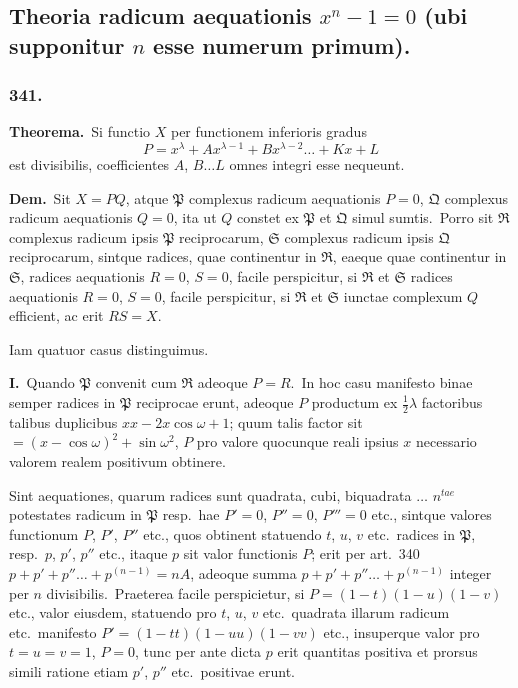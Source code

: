 \documentclass[12pt,a4paper]{article}
\theoremstyle{plain}
\theoremstyle{definition}
\theoremstyle{remark}
\begin{document}
\subsection*{Theoria radicum aequationis $x^n-1=0$ (ubi supponitur $n$
esse numerum primum).}

\subsubsection*{341.}

\textbf{Theorema.}\ Si functio $X$ per functionem inferioris gradus
\[P = x^\lambda + Ax^{\lambda-1} + Bx^{\lambda-2}\dots + Kx + L\]
est divisibilis, coefficientes $A$, $B\dots L$ omnes integri esse nequeunt.

\textbf{Dem.}\ Sit $X=PQ$, atque $\mathfrak{P}$ complexus radicum aequationis
$P=0$, $\mathfrak{Q}$ complexus radicum aequationis $Q=0$, ita ut $Q$ constet
ex $\mathfrak{P}$ et $\mathfrak{Q}$ simul sumtis.\ Porro sit $\mathfrak{R}$ complexus radicum
ipsis $\mathfrak{P}$ reciprocarum, $\mathfrak{S}$ complexus radicum ipsis $\mathfrak{Q}$
reciprocarum, sintque radices, quae continentur in $\mathfrak{R}$, eaeque quae
continentur in $\mathfrak{S}$, radices aequationis $R=0$, $S=0$, facile
perspicitur, si $\mathfrak{R}$ et $\mathfrak{S}$ radices aequationis $R=0$, $S=0$, facile
perspicitur, si $\mathfrak{R}$ et $\mathfrak{S}$ iunctae complexum $Q$ efficient, ac erit
$RS=X$.

Iam quatuor casus distinguimus.

\textbf{I.}\ Quando $\mathfrak{P}$ convenit cum $\mathfrak{R}$ adeoque $P=R$.\ In hoc
casu manifesto binae semper radices in $\mathfrak{P}$ reciprocae erunt, adeoque $P$
productum ex $\frac{1}{2}\lambda$ factoribus talibus duplicibus $xx-2x\cos\omega+1$; quum
talis factor sit $=(x-\cos\omega)^2+\sin\omega^2$, $P$ pro valore quocunque reali
ipsius $x$ necessario valorem realem positivum obtinere.

Sint aequationes, quarum radices sunt quadrata, cubi, biquadrata
$\dots$ $n^{tae}$ potestates radicum in $\mathfrak{P}$ resp.\ hae $P'=0$, $P''=0$,
$P'''=0$ etc., sintque valores functionum $P$, $P'$, $P''$ etc., quos
obtinent statuendo $t$, $u$, $v$ etc.\ radices in $\mathfrak{P}$, resp.\ $p$, $p'$,
$p''$ etc., itaque $p$ sit valor functionis $P$; erit per art.\ 340
$p+p'+p''\dots+p^{(n-1)} = nA$, adeoque summa $p+p'+p''\dots+p^{(n-1)}$
integer per $n$ divisibilis.\ Praeterea facile perspicietur, si $P=(1-t)(1-u)(1-v)$
etc., valor eiusdem, statuendo pro $t$, $u$, $v$ etc.\ quadrata illarum
radicum etc.\ manifesto $P'=(1-tt)(1-uu)(1-vv)$ etc., insuperque
valor pro $t=u=v=1$, $P=0$, tunc per ante dicta $p$ erit quantitas
positiva et prorsus simili ratione etiam $p'$, $p''$ etc.\ positivae erunt.
\end{document}
